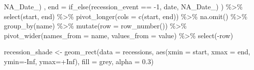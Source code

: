 \documentclass[
]{article}
\newenvironment{Shaded}{\begin{snugshade}}{\end{snugshade}}
\newcommand{\AttributeTok}[1]{\textcolor[rgb]{0.77,0.63,0.00}{#1}}
\newcommand{\ConstantTok}[1]{\textcolor[rgb]{0.00,0.00,0.00}{#1}}
\newcommand{\DecValTok}[1]{\textcolor[rgb]{0.00,0.00,0.81}{#1}}
\newcommand{\FloatTok}[1]{\textcolor[rgb]{0.00,0.00,0.81}{#1}}
\newcommand{\FunctionTok}[1]{\textcolor[rgb]{0.00,0.00,0.00}{#1}}
\newcommand{\NormalTok}[1]{#1}
\newcommand{\OtherTok}[1]{\textcolor[rgb]{0.56,0.35,0.01}{#1}}
\newcommand{\SpecialCharTok}[1]{\textcolor[rgb]{0.00,0.00,0.00}{#1}}
\newcommand{\StringTok}[1]{\textcolor[rgb]{0.31,0.60,0.02}{#1}}
\begin{document}
\begin{Shaded}
\begin{Highlighting}[]
\NormalTok{                         NA\_Date\_) ,}
         \AttributeTok{end =} \FunctionTok{if\_else}\NormalTok{(recession\_event }\SpecialCharTok{==} \SpecialCharTok{{-}}\DecValTok{1}\NormalTok{,}
\NormalTok{                       date,}
\NormalTok{                       NA\_Date\_) }
\NormalTok{         ) }\SpecialCharTok{\%\textgreater{}\%}
  \FunctionTok{select}\NormalTok{(start, end) }\SpecialCharTok{\%\textgreater{}\%}
  \FunctionTok{pivot\_longer}\NormalTok{(}\AttributeTok{cols =} \FunctionTok{c}\NormalTok{(start, end)) }\SpecialCharTok{\%\textgreater{}\%}
  \FunctionTok{na.omit}\NormalTok{() }\SpecialCharTok{\%\textgreater{}\%}
  \FunctionTok{group\_by}\NormalTok{(name) }\SpecialCharTok{\%\textgreater{}\%}
  \FunctionTok{mutate}\NormalTok{(}\AttributeTok{row =} \FunctionTok{row\_number}\NormalTok{()) }\SpecialCharTok{\%\textgreater{}\%}
  \FunctionTok{pivot\_wider}\NormalTok{(}\AttributeTok{names\_from =}\NormalTok{ name,}
              \AttributeTok{values\_from =}\NormalTok{ value) }\SpecialCharTok{\%\textgreater{}\%}
  \FunctionTok{select}\NormalTok{(}\SpecialCharTok{{-}}\NormalTok{row)}

\NormalTok{recession\_shade }\OtherTok{\textless{}{-}}
  \FunctionTok{geom\_rect}\NormalTok{(}\AttributeTok{data =}\NormalTok{ recessions, }\FunctionTok{aes}\NormalTok{(}\AttributeTok{xmin =}\NormalTok{ start, }\AttributeTok{xmax =}\NormalTok{ end, }\AttributeTok{ymin=}\SpecialCharTok{{-}}\ConstantTok{Inf}\NormalTok{, }\AttributeTok{ymax=}\SpecialCharTok{+}\ConstantTok{Inf}\NormalTok{),}
            \AttributeTok{fill =} \StringTok{\textquotesingle{}grey\textquotesingle{}}\NormalTok{, }\AttributeTok{alpha =} \FloatTok{0.3}\NormalTok{)}



\end{Highlighting}
\end{Shaded}
\end{document}
